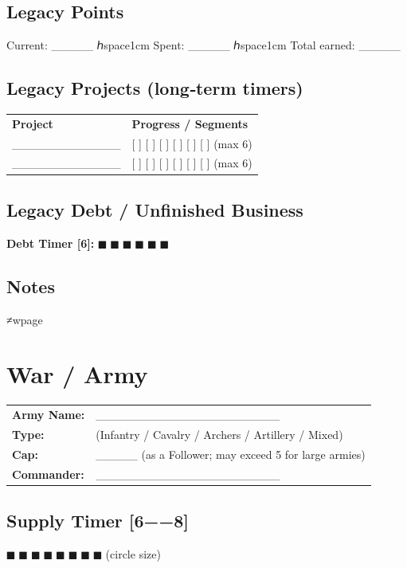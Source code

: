 \documentclass[11pt]{article}
\begin{document}
\subsection*{Legacy Points}
Current: _____ ℎspace{1cm} Spent: _____ ℎspace{1cm} Total earned: _____

\subsection*{Legacy Projects (long‑term timers)}
\small
\begin{tabularx}{\textwidth}{p{4cm} X}
\textbf{Project} & \textbf{Progress / Segments} \\
_____________ & [ ] [ ] [ ] [ ] [ ] [ ] (max 6) \\
_____________ & [ ] [ ] [ ] [ ] [ ] [ ] (max 6) \\
\end{tabularx}
\normalsize

\subsection*{Legacy Debt / Unfinished Business}
\textbf{Debt Timer [6]:} $■$ $■$ $■$ $■$ $■$ $■$

\subsection*{Notes}
\vspace{5cm}
≠wpage

\section*{War / Army}

\noindent
\begin{tabularx}{\textwidth}{X X}
\textbf{Army Name:} & ______________________ \\
\textbf{Type:} & (Infantry / Cavalry / Archers / Artillery / Mixed) \\
\textbf{Cap:} & _____ (as a Follower; may exceed 5 for large armies) \\
\textbf{Commander:} & ______________________ \\
\end{tabularx}

\subsection*{Supply Timer [6−−8]}
\noindent
$■$ $■$ $■$ $■$ $■$ $■$ $■$ $■$ (circle size)
\end{document}
